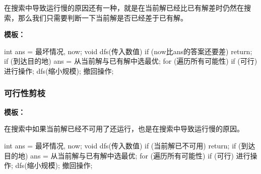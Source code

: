 在搜索中导致运行慢的原因还有一种，就是在当前解已经比已有解差时仍然在搜索，那么我们只需要判断一下当前解是否已经差于已有解。

\textbf{模板：}

\begin{cppcode}
int ans = 最坏情况, now;
void dfs(传入数值) {
  if (now比ans的答案还要差) return;
  if (到达目的地) ans = 从当前解与已有解中选最优;
  for (遍历所有可能性)
    if (可行) {
      进行操作;
      dfs(缩小规模);
      撤回操作;
    }
}
\end{cppcode}

\subsubsection{可行性剪枝}

\textbf{模板：}

在搜索中如果当前解已经不可用了还运行，也是在搜索中导致运行慢的原因。

\begin{cppcode}
int ans = 最坏情况, now;
void dfs(传入数值) {
  if (当前解已不可用) return;
  if (到达目的地) ans = 从当前解与已有解中选最优;
  for (遍历所有可能性)
    if (可行) {
      进行操作;
      dfs(缩小规模);
      撤回操作;
    }
}
\end{cppcode}
